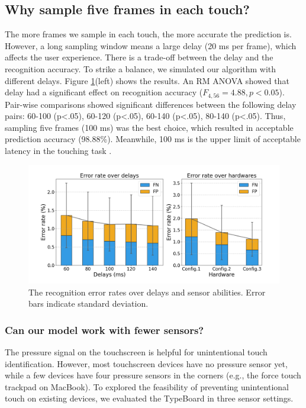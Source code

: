 \subsection{Why sample five frames in each touch?} 

The more frames we sample in each touch, the more accurate the prediction is. However, a long sampling window means a large delay (20 ms per frame), which affects the user experience. There is a trade-off between the delay and the recognition accuracy. To strike a balance, we simulated our algorithm with different delays. Figure \ref{fig:error_rate_diss}(left) shows the results. An RM ANOVA showed that delay had a significant effect on recognition accuracy ($F_{4,56}=4.88, p<0.05$). Pair-wise comparisons showed significant differences between the following delay pairs: 60-100 (p<.05), 60-120 (p<.05), 60-140 (p<.05), 80-140 (p<.05). Thus, sampling five frames (100 ms) was the best choice, which resulted in acceptable prediction accuracy (98.88\%). Meanwhile, 100 ms is the upper limit of acceptable latency in the touching task \cite{2017-System, 2014-Towards, 2016-Latency}.

\begin{figure}[!tbh]
	\includegraphics[width=1.0\linewidth]{figures/error_rate_diss.png}
	\centering
	\caption{The recognition error rates over delays and sensor abilities. Error bars indicate standard deviation.}
	\label{fig:error_rate_diss}
\end{figure}

\subsubsection{Can our model work with fewer sensors?}

The pressure signal on the touchscreen is helpful for unintentional touch identification. However, most touchscreen devices have no pressure sensor yet, while a few devices have four pressure sensors in the corners (e.g., the force touch trackpad on MacBook). To explored the feasibility of preventing unintentional touch on existing devices, we evaluated the TypeBoard in three sensor settings. 

